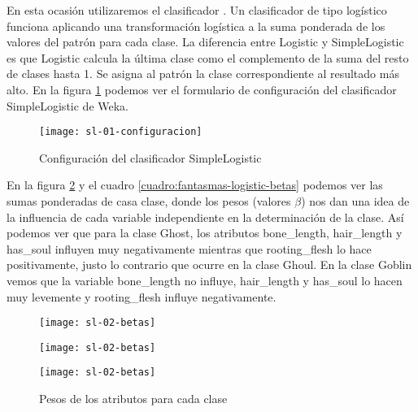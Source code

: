 En esta ocasión utilizaremos el clasificador . Un clasificador de tipo logístico funciona aplicando una transformación logística a la suma ponderada de los valores del patrón para cada clase. La diferencia entre Logistic y SimpleLogistic es que Logistic calcula la última clase como el complemento de la suma del resto de clases hasta 1. Se asigna al patrón la clase correspondiente al resultado más alto. En la figura \ref{fig:sl-configuracion} podemos ver el formulario de configuración del clasificador SimpleLogistic de Weka.

\begin{figure}[ht]
    \centering
    \texttt{[image: sl-01-configuracion]}
    \caption{Configuración del clasificador SimpleLogistic}
    \label{fig:sl-configuracion}
\end{figure}

En la figura \ref{fig:fantasmas-logistic-betas} y el cuadro \ref{cuadro:fantasmas-logistic-betas} podemos ver las sumas ponderadas de casa clase, donde los pesos (valores $\beta$) nos dan una idea de la influencia de cada variable independiente en la determinación de la clase. Así podemos ver que para la clase Ghost, los atributos bone\_length, hair\_length y has\_soul influyen muy negativamente mientras que rooting\_flesh lo hace positivamente, justo lo contrario que ocurre en la clase Ghoul. En la clase Goblin vemos que la variable bone\_length no influye, hair\_length y has\_soul lo hacen muy levemente y rooting\_flesh influye negativamente.

\begin{figure}[H]
    \centering
    \begin{minipage}{0.33\textwidth}
        \centering
        \texttt{[image: sl-02-betas]}
    \end{minipage}\hfill
    \begin{minipage}{0.33\textwidth}
        \centering
        \texttt{[image: sl-02-betas]}
    \end{minipage}\hfill
    \begin{minipage}{0.33\textwidth}
        \centering
        \texttt{[image: sl-02-betas]}
    \end{minipage}
    \caption{Pesos de los atributos para cada clase}
    \label{fig:fantasmas-logistic-betas}
\end{figure}

